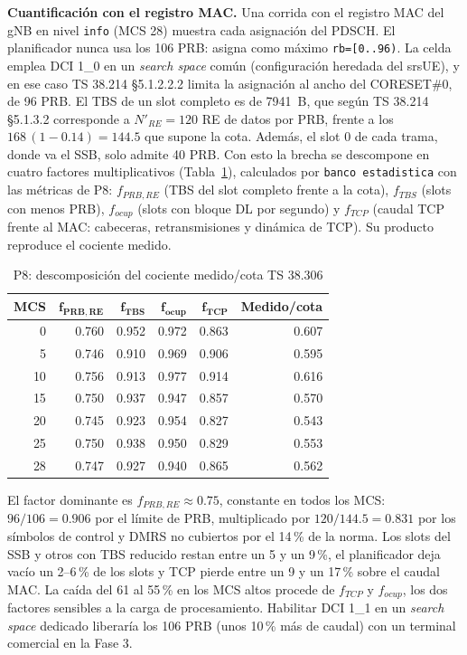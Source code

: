 \documentclass[conference]{IEEEtran}
\begin{document}
\textbf{Cuantificación con el registro MAC.} Una corrida con el registro MAC del gNB en nivel \texttt{info} (MCS 28) muestra cada asignación del PDSCH. El planificador nunca usa los 106 PRB: asigna como máximo \texttt{rb=[0..96)}. La celda emplea DCI 1\_0 en un \textit{search space} común (configuración heredada del srsUE), y en ese caso TS 38.214 §5.1.2.2.2 limita la asignación al ancho del CORESET\#0, de 96 PRB. El TBS de un slot completo es de 7941~B, que según TS 38.214 §5.1.3.2 corresponde a $N'_{RE}=120$ RE de datos por PRB, frente a los $168\,(1-0.14)=144.5$ que supone la cota. Además, el slot 0 de cada trama, donde va el SSB, solo admite 40 PRB. Con esto la brecha se descompone en cuatro factores multiplicativos (Tabla~\ref{tab:sobrecarga}), calculados por \texttt{banco estadistica} con las métricas de P8: $f_{PRB,RE}$ (TBS del slot completo frente a la cota), $f_{TBS}$ (slots con menos PRB), $f_{ocup}$ (slots con bloque DL por segundo) y $f_{TCP}$ (caudal TCP frente al MAC: cabeceras, retransmisiones y dinámica de TCP). Su producto reproduce el cociente medido.

\begin{table}[!t]
\caption{P8: descomposición del cociente medido/cota TS 38.306}
\label{tab:sobrecarga}
\centering
\footnotesize
\renewcommand{\arraystretch}{1.12}
\begin{tabular}{rrrrrr}
\toprule
\textbf{MCS} & $\mathbf{f_{PRB,RE}}$ & $\mathbf{f_{TBS}}$ & $\mathbf{f_{ocup}}$ & $\mathbf{f_{TCP}}$ & \textbf{Medido/cota} \\
\midrule
0 & 0.760 & 0.952 & 0.972 & 0.863 & 0.607 \\
5 & 0.746 & 0.910 & 0.969 & 0.906 & 0.595 \\
10 & 0.756 & 0.913 & 0.977 & 0.914 & 0.616 \\
15 & 0.750 & 0.937 & 0.947 & 0.857 & 0.570 \\
20 & 0.745 & 0.923 & 0.954 & 0.827 & 0.543 \\
25 & 0.750 & 0.938 & 0.950 & 0.829 & 0.553 \\
28 & 0.747 & 0.927 & 0.940 & 0.865 & 0.562 \\
\bottomrule
\end{tabular}
\end{table}

El factor dominante es $f_{PRB,RE}\approx0.75$, constante en todos los MCS: $96/106=0.906$ por el límite de PRB, multiplicado por $120/144.5=0.831$ por los símbolos de control y DMRS no cubiertos por el 14\,\% de la norma. Los slots del SSB y otros con TBS reducido restan entre un 5 y un 9\,\%, el planificador deja vacío un 2--6\,\% de los slots y TCP pierde entre un 9 y un 17\,\% sobre el caudal MAC. La caída del 61 al 55\,\% en los MCS altos procede de $f_{TCP}$ y $f_{ocup}$, los dos factores sensibles a la carga de procesamiento. Habilitar DCI 1\_1 en un \textit{search space} dedicado liberaría los 106 PRB (unos 10\,\% más de caudal) con un terminal comercial en la Fase 3.
\end{document}
